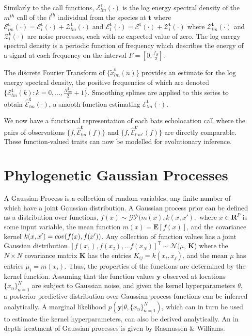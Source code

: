 \documentclass[wsdraft]{ws-rv9x6} %
\begin{document}
Similarly to the call functions, \(\mathcal{E}_{lm}^{\mathbf{t}}(\cdot)\) is the log energy spectral density of the \(m^{th}\) call of the \(l^{th}\) individual from the species at \({\mathbf{t}}\) where \(\mathcal{E}_{lm}^{\mathbf{t}}(\cdot) = \mathcal{E}_{l}^{\mathbf{t}}(\cdot) + \mathcal{Z}_{lm}^{\mathbf{t}}(\cdot)\) and \(\mathcal{E}_{l}^{\mathbf{t}}(\cdot) = \mathcal{E}^{\mathbf{t}}(\cdot) + \mathcal{Z}_{l}^{\mathbf{t}}(\cdot)\) where \(\mathcal{Z}_{lm}^{\mathbf{t}}(\cdot)\) and \(\mathcal{Z}_{l}^{\mathbf{t}}(\cdot)\) are noise processes, each with ae expected value of zero.  The log energy spectral density is a periodic function of frequency which describes the energy of a signal at each frequency on the interval \(F = [0, \frac{f_S}{2}]\).\cite{antoniou2006digital}

The discrete Fourier Transform\cite{antoniou2006digital}
of \(\{\tilde{x}_{lm}^{\mathbf{t}}(n)\}\) provides an estimate for the log energy spectral density, the positive frequencies of which are denoted \(\{\mathcal{E}_{lm}^{\mathbf{t}}(k) : k = 0, \dots, \frac{ N_{lm}^{\mathbf{t}}}{2} + 1\}\). Smoothing splines\cite{friedman2001elements} are applied to this series to obtain \(\hat{\mathcal{E}}_{lm}^{\mathbf{t}}(\cdot)\), a smooth function estimating \(\mathcal{E}_{lm}^{\mathbf{t}}(\cdot)\).

We now have a functional representation of each bats echolocation call where the pairs of observations \(\{f, \hat{\mathcal{E}}_{lm}^{\mathbf{t}}(f)\}\) and \(\{f, \hat{\mathcal{E}}_{l'm'}^{{\mathbf{t}}'}(f)\}\) are directly comparable. These function-valued traits can now be modelled for evolutionary inference.

\section{Phylogenetic Gaussian Processes}
\label{sec:pgp}
A Gaussian Process is a collection of random variables, any finite number of which have a joint Gaussian distribution. A Gaussian process prior can be defined as a distribution over functions, \(f(x) \sim \mathcal{GP}(m(x), k (x, x'),\) where \(x \in \mathbf{R}^P\) is some input variable, the mean function \(m(x) = \mathbf{E}[f(x)]\), and the covariance kernel \(k(x, x') = \mathnormal{cov}(f(x), f(x') )\). Any collection of function values has a joint Gaussian distribution
\(
[f(x_1), f(x_2), \dots f(x_N)]^{\mathsf{T}} \sim \mathcal{N}(\)\boldmath\(\mu\)\unboldmath, \(\mathbf{K}
\))
where the \(N \times N\) covariance matrix \(\mathbf{K}\)  has the entries \(K_{ij} = k(x_i, x_j)\), and the mean \boldmath\(\mu\)\unboldmath\(\) has entries \(\mu_i = m(x_i)\). Thus, the properties of the functions are determined by the kernel function. Assuming that the function values \(\mathbf{y}\) observed at locations \(\{x_n\}_{n=1}^N\) are subject to Gaussian noise, and given the kernel hyperparameters \(\theta\), a posterior predictive distribution over Gaussian process functions can be inferred analytically. A marginal likelihood \(p(\mathbf{y} | \theta, \{x_n\}_{n=1}^N)\), which can in turn be used to estimate the kernel hyperparameters, can also be derived analytically. An in depth treatment of Gaussian processes is given by Rasmussen \& Williams.\cite{rasmussen2006gaussian}  
\end{document}
